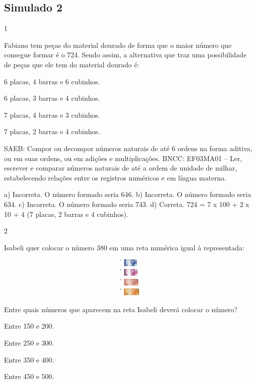 \begin{multicols}{2}
\begin{enumerate}
{\chapter{Simulado 2}

\num{1}

Fabiano tem peças do material dourado de forma que o maior número
que consegue formar é o 724. Sendo assim, a alternativa que traz uma
possibilidade de peças que ele tem do material dourado é:

\begin{escolha}
\item
  6 placas, 4 barras e 6 cubinhos.
\item
  6 placas, 3 barras e 4 cubinhos.
\item
  7 placas, 4 barras e 3 cubinhos.
\item
  7 placas, 2 barras e 4 cubinhos.
\end{escolha}

SAEB: Compor ou decompor números naturais de até 6 ordens na forma aditiva, ou em suas ordens, ou em adições e multiplicações.
BNCC: EF03MA01 -- Ler, escrever e comparar números naturais de até a ordem de unidade de milhar, estabelecendo relações entre os registros numéricos e em língua materna.

a) Incorreta. O número formado seria 646.
b) Incorreta. O número formado seria 634.
c) Incorreta. O número formado seria 743.
d) Correta. 724 = 7 x 100 + 2 x 10 + 4 (7 placas, 2 barras e 4 cubinhos).

\num{2}

Isabeli quer colocar o número 380 em uma reta numérica igual à representada:


\includegraphics[width=5.90556in,height=0.74931in]{media/image117.png}

Entre quais números que aparecem na reta Isabeli deverá colocar o número?

\begin{escolha}
\item
  Entre 150 e 200.
\item
  Entre 250 e 300.
\item
  Entre 350 e 400.
\item
  Entre 450 e 500.
\end{escolha}

}
\end{enumerate}
\end{multicols}
